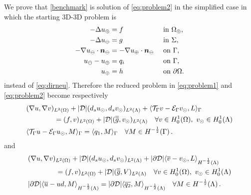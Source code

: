 \documentclass[r]{siamart171218}
\begin{document}
We prove that \eqref{benchmark} is solution of \eqref{eq:problem2} in the
simplified case in which the starting 3D-3D problem is
\begin{subequations}\label{eq:dirneu_simple}
\begin{align}
- \Delta u_{\oplus}  &= f  && \text{ in } \Omega_{\oplus},\\
- \Delta u_{\ominus} &= g  && \text{ in } \Sigma,\\
-\nabla u_{\ominus} \cdot \boldsymbol n_{\ominus} &= -\nabla u_{\oplus} \cdot \boldsymbol n_{\ominus}  && \text{ on } \Gamma,\\
u_{\ominus} - u_{\oplus} &= q_i  && \text{ on }  \Gamma,\\
u_{\oplus} &= h && \text{ on } \partial \Omega.
\end{align}
\end{subequations}
instead of \eqref{eq:dirneu}. Therefore the reduced problem in \eqref{eq:problem1} and
\eqref{eq:problem2} become respectively
%
\begin{subequations}\label{eq:problem1_simple}
\begin{align}
\label{eq:problem1_simple_eq1}
&(\nabla u,\nabla v)_{L^2(\Omega)} + |{\cal D}|(d_s \ud,d_s \vd)_{L^2(\Lambda)} 
+ \langle \mathcal{T}_{\Gamma} v  - \mathcal{E}_{\Gamma} \vd, L \rangle_\Gamma
\\
\nonumber
&\qquad\qquad= (f,v)_{L^2(\Omega)} + |{\cal D}| (\avrd{g},\vd)_{L^2(\Lambda)}
\quad \forall v \in H^1_0(\Omega), \ \vd \in H^1_0(\Lambda)
\\
\label{eq:problem1_simple_eq2}
&   \langle \mathcal{T}_{\Gamma} u - \mathcal{E}_{\Gamma} \ud , M \rangle_\Gamma =  \langle q_1 , M \rangle_\Gamma
\quad \forall M \in H^{-\frac12}(\Gamma)\,.
\end{align}
\end{subequations}
and
\begin{subequations}\label{eq:problem2_simple}
  \begin{align}
    \label{eq:problem2_simple_eq1}
&(\nabla u,\nabla v)_{L^2(\Omega)} + |{\cal D}|(d_s \ud,d_s \vd)_{L^2(\Lambda)} 
+ |{\partial \cal D}| \langle \avrc{v} - \vd, L \rangle_{H^{-\frac12}(\Lambda)} 
\\
\nonumber
&\qquad\qquad= (f,v)_{L^2(\Omega)} + |{\cal D}| (\avrd{g},V)_{L^2(\Lambda)}
\quad \forall v \in H^1_0(\Omega), \ \vd \in H^1_0(\Lambda)
\\
\label{eq:problem2_simple_eq2}
&  |\partial {\cal D}| \langle \avrc{u} -  ud, M \rangle_{H^{-\frac12}(\Lambda)} =
|\partial {\cal D}| \langle \avrc{q_2}, M \rangle_{H^{-\frac12}(\Lambda)}
\quad \forall M \in H^{-\frac12}(\Lambda)\,.
\end{align}
\end{subequations}
\end{document}
